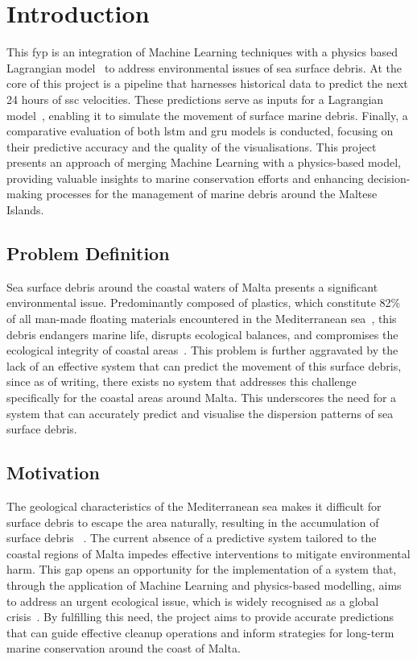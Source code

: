 \chapter{Introduction}
\label{chp:introduction}
This \acrshort{fyp} is an integration of Machine Learning techniques with a physics based Lagrangian model~\cite{1} to address environmental issues of sea surface debris. At the core of this project is a pipeline that harnesses historical data to predict the next 24 hours of \acrshort{ssc} velocities. These predictions serve as inputs for a Lagrangian model~\cite{1}, enabling it to simulate the movement of surface marine debris. Finally, a comparative evaluation of both \acrshort{lstm} and \acrshort{gru} models is conducted, focusing on their predictive accuracy and the quality of the visualisations. This project presents an approach of merging Machine Learning with a physics-based model, providing valuable insights to marine conservation efforts and enhancing decision-making processes for the management of marine debris around the Maltese Islands. 

\section{Problem Definition}
\label{sec:problem_definition}
Sea surface debris around the coastal waters of Malta presents a significant environmental issue. Predominantly composed of plastics, which constitute 82\% of all man-made floating materials encountered in the Mediterranean sea~\cite{2}, this debris endangers marine life, disrupts ecological balances, and compromises the ecological integrity of coastal areas~\cite{3}. This problem is further aggravated by the lack of an effective system that can predict the movement of this surface debris, since as of writing, there exists no system that addresses this challenge specifically for the coastal areas around Malta. This underscores the need for a system that can accurately predict and visualise the dispersion patterns of sea surface debris.

\section{Motivation}
\label{sec:motivation}
The geological characteristics of the Mediterranean sea makes it difficult for surface debris to  escape the area naturally, resulting in the accumulation of surface debris ~\cite{4}. The current absence of a predictive system tailored to the coastal regions of Malta impedes effective interventions to mitigate environmental harm. This gap opens an opportunity for the implementation of a system that, through the application of Machine Learning and physics-based modelling, aims to address an urgent ecological issue, which is widely recognised as a global crisis~\cite{5}. By fulfilling this need, the project aims to provide accurate predictions that can guide effective cleanup operations and inform strategies for long-term marine conservation around the coast of Malta. 

